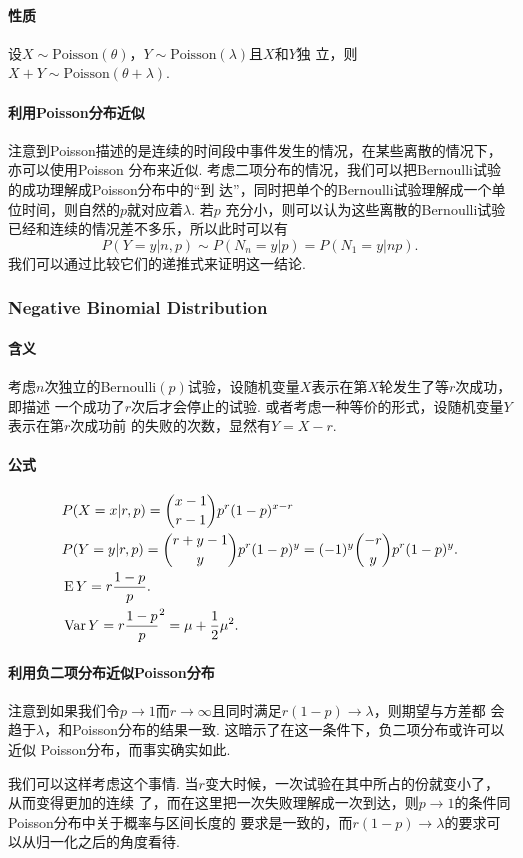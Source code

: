     \paragraph{性质}
    \begin{thm}
      设$X\sim\text{Poisson}(\theta)$，$Y\sim\text{Poisson}(\lambda)$且$X$和$Y$独
      立，则$X+Y\sim\text{Poisson}(\theta+\lambda)$.
    \end{thm}

    \paragraph{利用Poisson分布近似}
    注意到Poisson描述的是连续的时间段中事件发生的情况，在某些离散的情况下，亦可以使用Poisson
    分布来近似. 考虑二项分布的情况，我们可以把Bernoulli试验的成功理解成Poisson分布中的“到
    达”，同时把单个的Bernoulli试验理解成一个单位时间，则自然的$p$就对应着$\lambda$. 若$p$
    充分小，则可以认为这些离散的Bernoulli试验已经和连续的情况差不多乐，所以此时可以有
    \[
      P(Y=y|n,p) \sim P(N_n=y|p) = P(N_1=y|np).
    \]
    我们可以通过比较它们的递推式来证明这一结论. 
  \subsubsection{Negative Binomial Distribution}
    \paragraph{含义}
    考虑$n$次独立的Bernoulli$(p)$试验，设随机变量$X$表示在第$X$轮发生了等$r$次成功，即描述
    一个成功了$r$次后才会停止的试验. 或者考虑一种等价的形式，设随机变量$Y$表示在第$r$次成功前
    的失败的次数，显然有$Y=X-r$. 
    
    \paragraph{公式}
    \begin{align*}
      &P(X=x|r,p) = \binom{x-1}{r-1}p^r(1-p)^{x-r} \\
      &P(Y=y|r,p) = \binom{r+y-1}{y}p^r(1-p)^y = (-1)^y\binom{-r}{y}p^r(1-p)^y.\\
      &\operatorname{E} Y = r\frac{1-p}{p}. \\
      &\operatorname{Var} Y = r\frac{1-p}p^2 = \mu+\frac{1}{2}\mu^2.
    \end{align*}

    \paragraph{利用负二项分布近似Poisson分布}
    注意到如果我们令$p\to 1$而$r\to\infty$且同时满足$r(1-p)\to\lambda$，则期望与方差都
    会趋于$\lambda$，和Poisson分布的结果一致. 这暗示了在这一条件下，负二项分布或许可以近似
    Poisson分布，而事实确实如此. \par
    我们可以这样考虑这个事情. 当$r$变大时候，一次试验在其中所占的份就变小了，从而变得更加的连续
    了，而在这里把一次失败理解成一次到达，则$p\to 1$的条件同Poisson分布中关于概率与区间长度的
    要求是一致的，而$r(1-p)\to\lambda$的要求可以从归一化之后的角度看待. 
